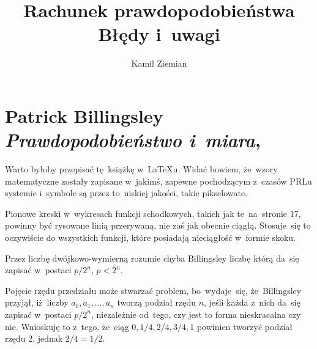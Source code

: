\documentclass[a4paper,11pt]{article}
\title{Rachunek prawdopodobieństwa \\
  {\Large Błędy i~uwagi}}
\author{Kamil Ziemian}
\numberwithin{equation}{section}
\begin{document}





\maketitle %





\section{Patrick Billingsley
  \textit{Prawdopodobieństwo i~miara},
  \cite{BillingsleyPrawdopodobienstwoIMiara2009}}

\vspace{0em}



\vspace{0em}


\noindent
Warto byłoby przepisać tę~książkę w~\LaTeX u. Widać bowiem, że~wzory
matematyczne zostały zapisane w~jakimś, zapewne pochodzącym z~czasów PRLu
systemie i~symbole są przez to~niskiej jakości, takie pikselowate.

\VerSpaceFour





\noindent
Pionowe kreski w~wykresach funkcji schodkowych, takich jak
te~na~stronie 17, powinny być rysowane linią przerywaną, nie zaś jak
obecnie ciągłą. Stosuje~się to oczywiście do wszystkich funkcji, które
posiadają nieciągłość w~formie skoku.

\VerSpaceFour







\noindent
{} Przez liczbę dwójkowo-wymierną rozumie chyba Billingsley liczbę
którą da~się zapisać w~postaci $p / 2^{ n }$, $p < 2^{ n }$.

\VerSpaceFour





\noindent
{} Pojęcie rzędu przedziału może stwarzać problem, bo~wydaje~się,
że~Billingsley przyjął, iż~liczby $a_{ 0 }, a_{ 1 }, \ldots, a_{ n }$ tworzą
podział rzędu $n$, jeśli każda z~nich da~się zapisać w~postaci
$p / 2^{ n }$, niezależnie od~tego, czy jest to forma nieskracalna czy nie.
Wnioskuję to z~tego, że~ciąg $0, 1/4, 2/4, 3/4, 1$ powinien tworzyć podział
rzędu 2, jednak $2/4 = 1/2$.
\end{document}
